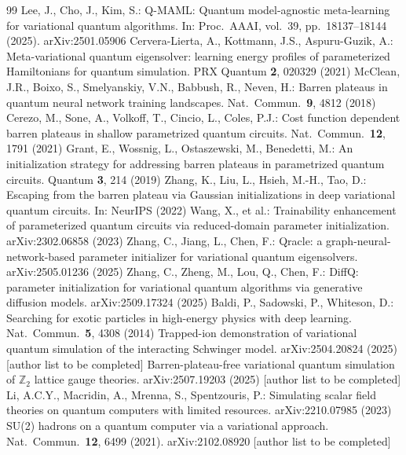 \begin{thebibliography}{99}
 Lee, J., Cho, J., Kim, S.: Q-MAML: Quantum model-agnostic meta-learning for variational quantum algorithms. In: Proc.\ AAAI, vol.\ 39, pp.\ 18137--18144 (2025). arXiv:2501.05906
 Cervera-Lierta, A., Kottmann, J.S., Aspuru-Guzik, A.: Meta-variational quantum eigensolver: learning energy profiles of parameterized Hamiltonians for quantum simulation. PRX Quantum \textbf{2}, 020329 (2021)
 McClean, J.R., Boixo, S., Smelyanskiy, V.N., Babbush, R., Neven, H.: Barren plateaus in quantum neural network training landscapes. Nat.\ Commun.\ \textbf{9}, 4812 (2018)
 Cerezo, M., Sone, A., Volkoff, T., Cincio, L., Coles, P.J.: Cost function dependent barren plateaus in shallow parametrized quantum circuits. Nat.\ Commun.\ \textbf{12}, 1791 (2021)
 Grant, E., Wossnig, L., Ostaszewski, M., Benedetti, M.: An initialization strategy for addressing barren plateaus in parametrized quantum circuits. Quantum \textbf{3}, 214 (2019)
 Zhang, K., Liu, L., Hsieh, M.-H., Tao, D.: Escaping from the barren plateau via Gaussian initializations in deep variational quantum circuits. In: NeurIPS (2022)
 Wang, X., et al.: Trainability enhancement of parameterized quantum circuits via reduced-domain parameter initialization. arXiv:2302.06858 (2023)
 Zhang, C., Jiang, L., Chen, F.: Qracle: a graph-neural-network-based parameter initializer for variational quantum eigensolvers. arXiv:2505.01236 (2025)
 Zhang, C., Zheng, M., Lou, Q., Chen, F.: DiffQ: parameter initialization for variational quantum algorithms via generative diffusion models. arXiv:2509.17324 (2025)
 Baldi, P., Sadowski, P., Whiteson, D.: Searching for exotic particles in high-energy physics with deep learning. Nat.\ Commun.\ \textbf{5}, 4308 (2014)
 Trapped-ion demonstration of variational quantum simulation of the interacting Schwinger model. arXiv:2504.20824 (2025) [author list to be completed]
 Barren-plateau-free variational quantum simulation of $\mathbb{Z}_2$ lattice gauge theories. arXiv:2507.19203 (2025) [author list to be completed]
 Li, A.C.Y., Macridin, A., Mrenna, S., Spentzouris, P.: Simulating scalar field theories on quantum computers with limited resources. arXiv:2210.07985 (2023)
 SU(2) hadrons on a quantum computer via a variational approach. Nat.\ Commun.\ \textbf{12}, 6499 (2021). arXiv:2102.08920 [author list to be completed]

\end{thebibliography}
